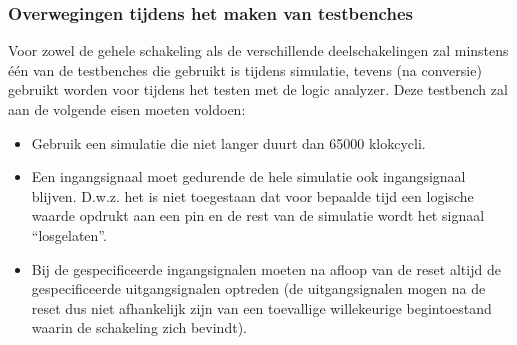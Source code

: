 \subsubsection{Overwegingen tijdens het maken van testbenches}
Voor zowel de gehele schakeling als de verschillende deelschakelingen zal
minstens \'e\'en van de testbenches die gebruikt is tijdens simulatie, tevens 
(na conversie) gebruikt worden voor tijdens het testen met de logic analyzer.
Deze testbench zal aan de volgende eisen moeten voldoen:
\begin{itemize}
\item
Gebruik een simulatie die niet langer duurt dan 65000 klokcycli.
\item
Een ingangsignaal moet gedurende de hele simulatie ook ingangsignaal blijven. 
D.w.z. het is niet toegestaan dat voor bepaalde tijd een logische waarde opdrukt aan
een pin en de rest van de simulatie wordt het signaal ``losgelaten''.
\item
Bij de gespecificeerde ingangsignalen moeten na afloop van de reset altijd 
de gespecificeerde uitgangsignalen optreden 
(de uitgangsignalen mogen na de reset dus niet afhankelijk zijn van een 
toevallige willekeurige begintoestand waarin de schakeling zich bevindt).
\end{itemize}
